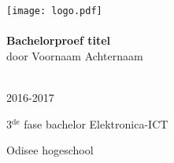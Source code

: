 \begin{titlepage}
\begin{center}
\texttt{[image: logo.pdf]}~\\[1cm]

\HRule \\[0.4cm]
{ \LARGE \bfseries Bachelorproef titel}\\[0.4cm]
{door Voornaam Achternaam}\\[0.2cm]

\HRule \\[1.5cm]

\vfill

{\large 2016-2017}

{\large{3$^{\text{de}}$ fase bachelor Elektronica-ICT}}

{\large Odisee hogeschool}

\end{center}
\end{titlepage}

